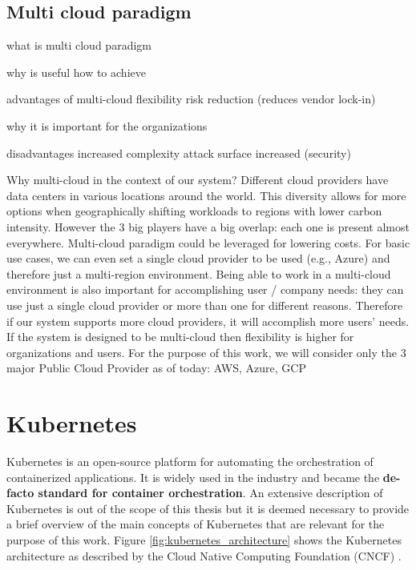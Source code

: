 

\subsection{Multi cloud paradigm}

what is multi cloud paradigm

why is useful
how to achieve

advantages of multi-cloud
flexibility
risk reduction (reduces vendor lock-in)

why it is important for the organizations


disadvantages
increased complexity
attack surface increased (security)




Why multi-cloud in the context of our system?
Different cloud providers have data centers in various locations around the world. This diversity allows for more options when geographically shifting workloads to regions with lower carbon intensity.
However the 3 big players have a big overlap: each one is present almost everywhere.
Multi-cloud paradigm could be leveraged for lowering costs.
For basic use cases, we can even set a single cloud provider to be used (e.g., Azure) and therefore just a multi-region environment.
Being able to work in a multi-cloud environment is also important for accomplishing user / company needs: they can use just a single cloud provider or more than one for different reasons. Therefore if our system supports more cloud providers, it will accomplish more users' needs.
If the system is designed to be multi-cloud then flexibility is higher for organizations and users.
For the purpose of this work, we will consider only the 3 major Public Cloud Provider as of today: AWS, Azure, GCP

\section{Kubernetes}

Kubernetes is an open-source platform for automating the orchestration of containerized applications.
It is widely used in the industry and became the \textbf{de-facto standard for container orchestration}.
An extensive description of Kubernetes is out of the scope of this thesis but it is deemed necessary to provide a brief overview of the main concepts of Kubernetes that are relevant for the purpose of this work.
Figure \ref{fig:kubernetes_architecture} shows the Kubernetes architecture as described by the Cloud Native Computing Foundation (CNCF) \cite{kubernetes_cnfc}.

